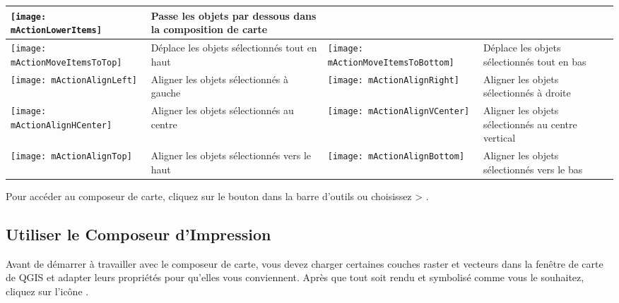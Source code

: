 \begin{table}[h]
\begin{tabular}{|l|p{6.9cm}|l|p{6.9cm}|}
 \texttt{[image: mActionLowerItems]} & Passe les objets par dessous dans la composition de carte \\
\hline \texttt{[image: mActionMoveItemsToTop]} & Déplace les objets sélectionnés tout en haut & 
 \texttt{[image: mActionMoveItemsToBottom]} & Déplace les objets sélectionnés tout en bas \\
 \hline \texttt{[image: mActionAlignLeft]} & Aligner les objets sélectionnés à gauche &
 \texttt{[image: mActionAlignRight]} & Aligner les objets sélectionnés à droite \\
 \hline \texttt{[image: mActionAlignHCenter]} & Aligner les objets sélectionnés au centre &
 \texttt{[image: mActionAlignVCenter]} & Aligner les objets sélectionnés au centre vertical \\
 \hline \texttt{[image: mActionAlignTop]} & Aligner les objets sélectionnés vers le haut &
 \texttt{[image: mActionAlignBottom]} & Aligner les objets sélectionnés  vers le bas \\
\hline
\end{tabular}
\end{table}

Pour accéder au composeur de carte, cliquez sur le bouton  dans la barre d'outils ou choisissez  > .

\subsection{Utiliser le Composeur d'Impression}\label{label_useprintcomposer} 


Avant de démarrer à travailler avec le composeur de carte, vous devez charger certaines couches raster et vecteurs dans la fenêtre de carte de QGIS et 
adapter leurs propriétés pour qu'elles vous conviennent. Après que tout soit rendu et symbolisé comme vous le souhaitez, cliquez sur l'icône .

